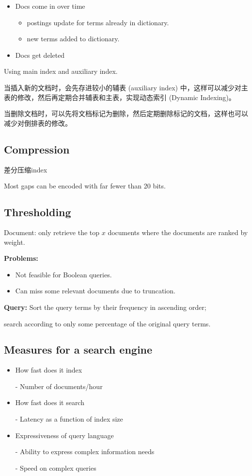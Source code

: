 \documentclass{article}
\begin{document}
\begin{itemize}
    \item Docs come in over time
    \begin{itemize}
        \item postings update for terms already in dictionary. 
        \item new terms added to dictionary. 
    \end{itemize}
    \item Docs get deleted
\end{itemize}

Using main index and auxiliary index. 

当插入新的文档时，会先存进较小的辅表 (auxiliary index) 中，这样可以减少对主表的修改，然后再定期合并辅表和主表，实现动态索引 (Dynamic Indexing)。

当删除文档时，可以先将文档标记为删除，然后定期删除标记的文档，这样也可以减少对倒排表的修改。

\subsection{Compression}
差分压缩index\par
Most gaps can be encoded with far fewer than 20 bits.\par

\subsection{Thresholding}
Document: only retrieve the top $x$ documents where the documents are ranked by weight. 

\textbf{Problems:}
\begin{itemize}
    \item Not feasible for Boolean queries. 
    \item Can miss some relevant documents due to truncation. 
\end{itemize}

\textbf{Query:} Sort the query terms by their frequency in ascending order;\par
search according to only some percentage of the original query terms. 



\subsection{Measures for a search engine}
\begin{itemize}
    \item How fast does it index\par
    - Number of documents/hour
    \item How fast does it search\par
    - Latency as a function of index size
    \item Expressiveness of query language\par
    - Ability to express complex information needs\par
    - Speed on complex queries
\end{itemize}
\end{document}
